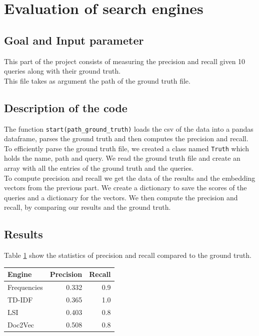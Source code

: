 \documentclass [14 pt]{article}
\begin{document}
\section{Evaluation of search engines} %
\subsection{Goal and Input parameter} %
This part of the project consists of measuring the precision and recall given 10 queries along with their ground truth.\\
This file takes as argument the path of the ground truth file.

\subsection{Description of the code} %
The function \texttt{start(path\_ground\_truth)} loads the csv of the data  into a pandas dataframe, parses the ground truth and then computes the precision and recall.\\
To efficiently parse the ground truth file, we created a class named \texttt{Truth} which holds the name, path and query. We read the ground truth file and create an array with all the entries of the ground truth and the queries.\\
To compute precision and recall we get the data of the results and the embedding vectors from the previous part. We create a dictionary to save the scores of the queries and a dictionary for the vectors. We then compute the precision and recall, by comparing our results and the ground truth.

\subsection{Results} %
Table \ref{tab:Evaluation} show the statistics of precision and recall compared to the ground truth.

\begin{table}[h]
\centering
\begin{tabular}{| l r r |}
\hline
\textbf{Engine}	&  \textbf{Precision}	&  \textbf{Recall}	\\ \hline\hline
Frequencies 		&	0.332	&	0.9	\\
TD-IDF			&	0.365	&	1.0	\\
LSI				&	0.403	&	0.8	\\
Doc2Vec			&	0.508	&	0.8	\\ \hline
\end{tabular}
\label{tab:Evaluation}
\end{table}
\end{document}
